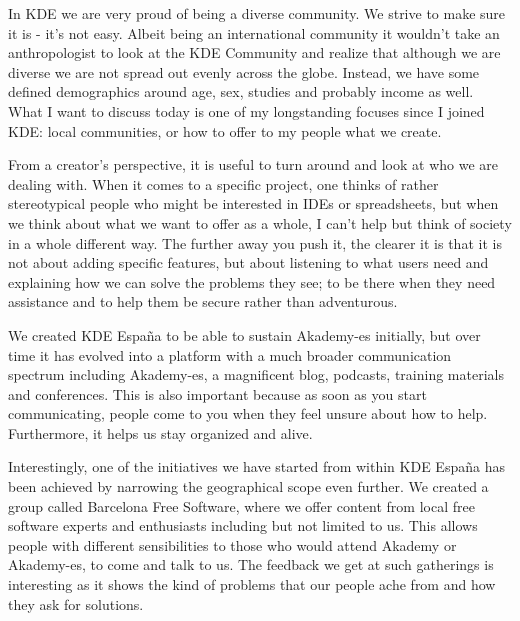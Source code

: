 

\noindent{}In KDE we are very proud of being a diverse community. We strive to make sure it is - it's not easy. Albeit being an international community it wouldn't take an anthropologist to look at the KDE Community and realize that although we are diverse we are not spread out evenly across the globe. Instead, we have some defined demographics around age, sex, studies and probably income as well. What I want to discuss today is one of my longstanding focuses since I joined KDE: local communities, or how to offer to my people what we create.

From a creator's perspective, it is useful to turn around and look at who we are dealing with. When it comes to a specific project, one thinks of rather stereotypical people who might be interested in IDEs or spreadsheets, but when we think about what we want to offer as a whole, I can't help but think of society in a whole different way. The further away you push it, the clearer it is that it is not about adding specific features, but about listening to what users need and explaining how we can solve the problems they see; to be there when they need assistance and to help them be secure rather than adventurous.

We created KDE Espa\~{n}a to be able to sustain Akademy-es initially, but over time it has evolved into a platform with a much broader communication spectrum including Akademy-es, a magnificent blog, podcasts, training materials and conferences. This is also important because as soon as you start communicating, people come to you when they feel unsure about how to help. Furthermore, it helps us stay organized and alive.

Interestingly, one of the initiatives we have started from within KDE Espa\~{n}a has been achieved by narrowing the geographical scope even further. We created a group called Barcelona Free Software, where we offer content from local free software experts and enthusiasts including but not limited to us. This allows people with different sensibilities to those who would attend Akademy or Akademy-es, to come and talk to us. The feedback we get at such gatherings is interesting as it shows the kind of problems that our people ache from and how they ask for solutions.

